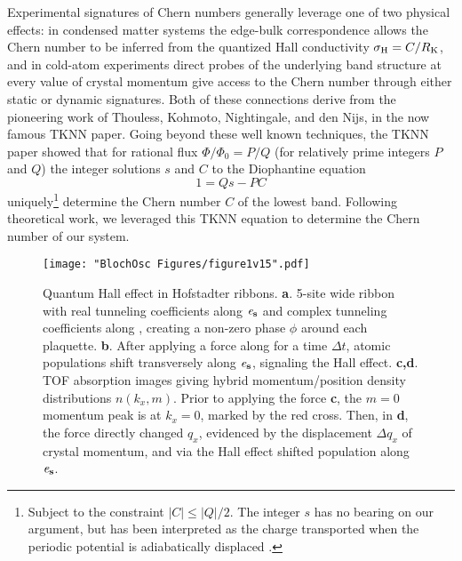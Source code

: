 	Experimental signatures of Chern numbers generally leverage one of two physical effects: in condensed matter systems the edge-bulk correspondence allows the Chern number to be inferred from the quantized Hall conductivity $\sigma_{\rm{H}} = C/R_{\rm{K}}$, and in cold-atom experiments direct probes of the underlying band structure at every value of crystal momentum give access to the Chern number through either static \cite{Aidelsburger2015,Wang2013} or dynamic \cite{Song2018,Tarnowski2018,Sun2018,Asteria2018} signatures.  Both of these connections derive from the pioneering work of  Thouless, Kohmoto, Nightingale, and den Nijs\cite{Thouless1982}, in the now famous TKNN paper.  Going beyond these well known techniques, the TKNN paper showed that for rational flux $\Phi/\Phi_0 = P/Q$ (for relatively prime integers $P$ and $Q$) the integer solutions  $s$ and $C$ to the Diophantine equation 
\begin{equation}
1 = Q s - P C
\label{eqn:Diophantine}
\end{equation}  
uniquely\footnote{Subject to the constraint $|C|\leq |Q|/2$\cite{Thouless1982, Kohmoto1989}. The integer $s$ has no bearing on our argument, but has been interpreted as the charge transported when the periodic potential is adiabatically displaced \cite{MacDonald1984,Kunz1986}.} determine the Chern number $C$ of the lowest band. Following theoretical work\cite{Huang2013,Liu2013,Wang2013,Zhang2016,Mugel2017}, we leveraged this TKNN equation to determine the Chern number of our system.
		
\begin{figure*}
\texttt{[image: "BlochOsc Figures/figure1v15".pdf]}
\caption{Quantum Hall effect in Hofstadter ribbons. \textbf{a}. 5-site wide ribbon with real tunneling coefficients along $\bf{\mathit{e}_s}$   and complex tunneling coefficients along \ex,  creating a non-zero phase  $\phi$ around each plaquette.  \textbf{b}. After applying a force along \ex  for a time $\Delta t$, atomic populations shift transversely along $\bf{\mathit{e}_s}$, signaling the Hall effect. \textbf{c,d}.  TOF absorption images giving hybrid momentum/position density distributions $n(k_x,m)$. Prior to applying the force \textbf{c}, the $m=0$ momentum peak is at $k_x=0$, marked by the red cross. Then, in \textbf{d}, the force directly changed $q_x$, evidenced by the displacement $\Delta q_x$ of crystal momentum, and via the Hall effect shifted population along $\bf{\mathit{e}_s}$. }
\label{fig:laughlinPump}
\end{figure*}

